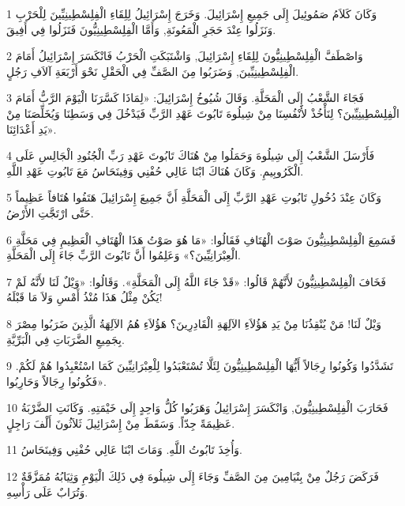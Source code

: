 \par 1 وَكَانَ كَلاَمُ صَمُوئِيلَ إِلَى جَمِيعِ إِسْرَائِيلَ. وَخَرَجَ إِسْرَائِيلُ لِلِقَاءِ الْفِلِسْطِينِيِّينَ لِلْحَرْبِ وَنَزَلُوا عِنْدَ حَجَرِ الْمَعُونَةِ, وَأَمَّا الْفِلِسْطِينِيُّونَ فَنَزَلُوا فِي أَفِيقَ.
\par 2 وَاصْطَفَّ الْفِلِسْطِينِيُّونَ لِلِقَاءِ إِسْرَائِيلَ, وَاشْتَبَكَتِ الْحَرْبُ فَانْكَسَرَ إِسْرَائِيلُ أَمَامَ الْفِلِسْطِينِيِّينَ, وَضَرَبُوا مِنَ الصَّفِّ فِي الْحَقْلِ نَحْوَ أَرْبَعَةِ آلاَفِ رَجُلٍ.
\par 3 فَجَاءَ الشَّعْبُ إِلَى الْمَحَلَّةِ. وَقَالَ شُيُوخُ إِسْرَائِيلَ: «لِمَاذَا كَسَّرَنَا الْيَوْمَ الرَّبُّ أَمَامَ الْفِلِسْطِينِيِّينَ؟ لِنَأْخُذْ لأَنْفُسِنَا مِنْ شِيلُوهَ تَابُوتَ عَهْدِ الرَّبِّ فَيَدْخُلَ فِي وَسَطِنَا وَيُخَلِّصَنَا مِنْ يَدِ أَعْدَائِنَا».
\par 4 فَأَرْسَلَ الشَّعْبُ إِلَى شِيلُوهَ وَحَمَلُوا مِنْ هُنَاكَ تَابُوتَ عَهْدِ رَبِّ الْجُنُودِ الْجَالِسِ عَلَى الْكَرُوبِيمِ. وَكَانَ هُنَاكَ ابْنَا عَالِي حُفْنِي وَفِينَحَاسُ مَعَ تَابُوتِ عَهْدِ اللَّهِ.
\par 5 وَكَانَ عِنْدَ دُخُولِ تَابُوتِ عَهْدِ الرَّبِّ إِلَى الْمَحَلَّةِ أَنَّ جَمِيعَ إِسْرَائِيلَ هَتَفُوا هُتَافاً عَظِيماً حَتَّى ارْتَجَّتِ الأَرْضُ.
\par 6 فَسَمِعَ الْفِلِسْطِينِيُّونَ صَوْتَ الْهُتَافِ فَقَالُوا: «مَا هُوَ صَوْتُ هَذَا الْهُتَافِ الْعَظِيمِ فِي مَحَلَّةِ الْعِبْرَانِيِّينَ؟» وَعَلِمُوا أَنَّ تَابُوتَ الرَّبِّ جَاءَ إِلَى الْمَحَلَّةِ.
\par 7 فَخَافَ الْفِلِسْطِينِيُّونَ لأَنَّهُمْ قَالُوا: «قَدْ جَاءَ اللَّهُ إِلَى الْمَحَلَّةِ». وَقَالُوا: «وَيْلٌ لَنَا لأَنَّهُ لَمْ يَكُنْ مِثْلُ هَذَا مُنْذُ أَمْسِ وَلاَ مَا قَبْلَهُ!
\par 8 وَيْلٌ لَنَا! مَنْ يُنْقِذُنَا مِنْ يَدِ هَؤُلاَءِ الآلِهَةِ الْقَادِرِينَ؟ هَؤُلاَءِ هُمُ الآلِهَةُ الَّذِينَ ضَرَبُوا مِصْرَ بِجَمِيعِ الضَّرَبَاتِ فِي الْبَرِّيَّةِ.
\par 9 تَشَدَّدُوا وَكُونُوا رِجَالاً أَيُّهَا الْفِلِسْطِينِيُّونَ لِئَلَّا تُسْتَعْبَدُوا لِلْعِبْرَانِيِّينَ كَمَا اسْتُعْبِدُوا هُمْ لَكُمْ. فَكُونُوا رِجَالاً وَحَارِبُوا».
\par 10 فَحَارَبَ الْفِلِسْطِينِيُّونَ, وَانْكَسَرَ إِسْرَائِيلُ وَهَرَبُوا كُلُّ وَاحِدٍ إِلَى خَيْمَتِهِ. وَكَانَتِ الضَّرْبَةُ عَظِيمَةً جِدّاً. وَسَقَطَ مِنْ إِسْرَائِيلَ ثَلاَثُونَ أَلْفَ رَاجِلٍ.
\par 11 وَأُخِذَ تَابُوتُ اللَّهِ. وَمَاتَ ابْنَا عَالِي حُفْنِي وَفِينَحَاسُ.
\par 12 فَرَكَضَ رَجُلٌ مِنْ بِنْيَامِينَ مِنَ الصَّفِّ وَجَاءَ إِلَى شِيلُوهَ فِي ذَلِكَ الْيَوْمِ وَثِيَابُهُ مُمَزَّقَةٌ وَتُرَابٌ عَلَى رَأْسِهِ.

